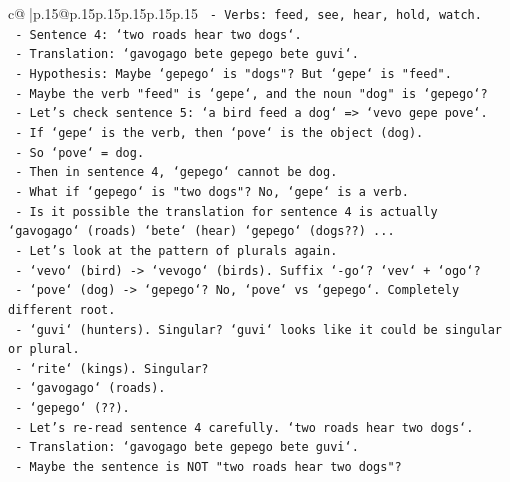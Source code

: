 \documentclass{article}
\begin{document}
{\begin{supertabular}{c@{$\;$}|p{.15\linewidth}@{}p{.15\linewidth}p{.15\linewidth}p{.15\linewidth}p{.15\linewidth}p{.15\linewidth}}
{{{\texttt{               {-} Verbs: feed, see, hear, hold, watch.} \\
\texttt{               {-} Sentence 4: `two roads hear two dogs`.} \\
\texttt{               {-} Translation: `gavogago bete gepego bete guvi`.} \\
\texttt{               {-} Hypothesis: Maybe `gepego` is "dogs"? But `gepe` is "feed".} \\
\texttt{               {-} Maybe the verb "feed" is `gepe`, and the noun "dog" is `gepego`?} \\
\texttt{               {-} Let's check sentence 5: `a bird feed a dog` => `vevo gepe pove`.} \\
\texttt{                 {-} If `gepe` is the verb, then `pove` is the object (dog).} \\
\texttt{                 {-} So `pove` = dog.} \\
\texttt{                 {-} Then in sentence 4, `gepego` cannot be dog.} \\
\texttt{                 {-} What if `gepego` is "two dogs"? No, `gepe` is a verb.} \\
\texttt{                 {-} Is it possible the translation for sentence 4 is actually `gavogago` (roads) `bete` (hear) `gepego` (dogs??) ...} \\
\texttt{                 {-} Let's look at the pattern of plurals again.} \\
\texttt{                   {-} `vevo` (bird) {-}> `vevogo` (birds). Suffix `{-}go`? `vev` + `ogo`?} \\
\texttt{                   {-} `pove` (dog) {-}> `gepego`? No, `pove` vs `gepego`. Completely different root.} \\
\texttt{                   {-} `guvi` (hunters). Singular? `guvi` looks like it could be singular or plural.} \\
\texttt{                   {-} `rite` (kings). Singular?} \\
\texttt{                   {-} `gavogago` (roads).} \\
\texttt{                   {-} `gepego` (??).} \\
\texttt{                 {-} Let's re{-}read sentence 4 carefully. `two roads hear two dogs`.} \\
\texttt{                 {-} Translation: `gavogago bete gepego bete guvi`.} \\
\texttt{                 {-} Maybe the sentence is NOT "two roads hear two dogs"?} \\
}}}
\end{supertabular}}
\end{document}

